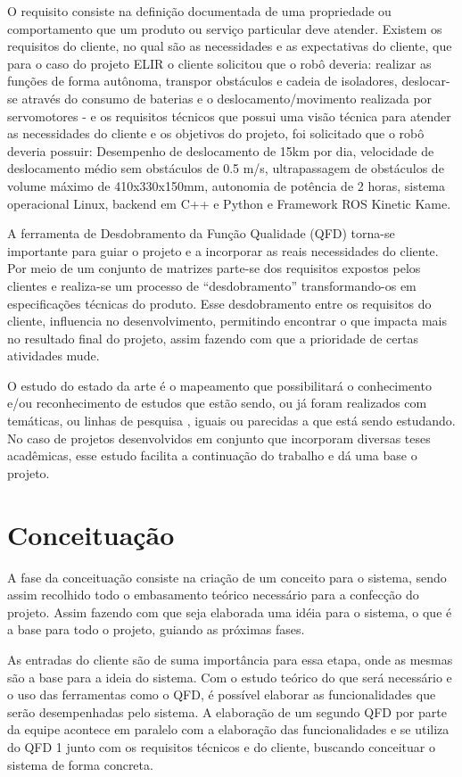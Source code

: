 O requisito consiste na definição documentada  de uma propriedade ou comportamento que um produto ou serviço particular deve atender. Existem os requisitos do cliente, no qual são as necessidades e as expectativas do cliente, que para o caso do projeto ELIR o cliente solicitou que o robô deveria: realizar as funções de forma autônoma, transpor obstáculos e cadeia de isoladores, deslocar-se através do consumo de baterias e o deslocamento/movimento realizada por servomotores - e os requisitos técnicos que possui uma visão técnica para atender as necessidades do cliente e os objetivos do projeto, foi solicitado que o robô deveria possuir: Desempenho de deslocamento de 15km por dia, velocidade de deslocamento médio  sem obstáculos de 0.5 m/s, ultrapassagem de obstáculos de volume máximo de  410x330x150mm, autonomia de potência de 2 horas, sistema operacional Linux, backend em C++ e Python e Framework ROS Kinetic Kame.

A ferramenta de Desdobramento da Função Qualidade (QFD) torna-se importante para guiar o projeto e a incorporar as reais necessidades do cliente.  Por meio de um conjunto de matrizes parte-se dos requisitos expostos pelos clientes e realiza-se um processo de “desdobramento” transformando-os em especificações técnicas do produto. Esse desdobramento entre os requisitos do cliente, influencia no desenvolvimento, permitindo encontrar o que impacta mais no resultado final do projeto, assim fazendo com que a prioridade de certas atividades mude.

O estudo do estado da arte é o mapeamento que possibilitará o conhecimento e/ou reconhecimento de estudos que estão sendo, ou já foram realizados com temáticas, ou linhas de pesquisa , iguais ou parecidas a que está sendo estudando. No caso de projetos desenvolvidos em conjunto que incorporam diversas teses acadêmicas, esse estudo facilita a continuação do trabalho e dá uma base o projeto.

\section{Conceituação}
\label{sec:conc}
A fase da conceituação consiste na criação de um conceito para o sistema, sendo assim recolhido todo o embasamento teórico necessário para a confecção do projeto. Assim fazendo com que seja elaborada uma idéia para o sistema, o que é a base para todo o projeto, guiando as próximas fases.

As entradas do cliente são de suma importância para essa etapa, onde as mesmas são a base para a ideia do sistema. Com o estudo teórico do que será necessário e o uso das ferramentas como o QFD, é possível elaborar as funcionalidades que serão desempenhadas pelo sistema. A elaboração de um segundo QFD por parte da equipe acontece em paralelo com a elaboração das funcionalidades e se utiliza do QFD 1 junto com os requisitos técnicos e do cliente, buscando conceituar o sistema de forma concreta.

